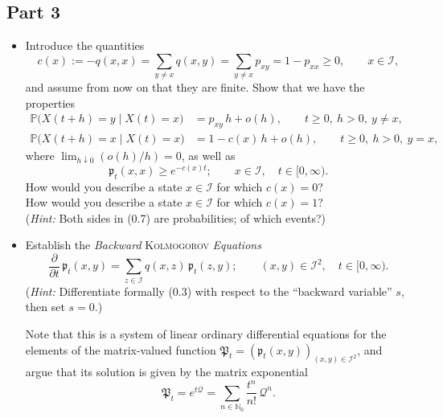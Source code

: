 \documentclass[letterpaper]{article}
\begin{document}
			\subsection{Part 3}
			\begin{itemize}
			\item[(d)] Introduce the quantities
			\begin{equation}
				c(x) := -q(x,x) = \sum_{y \neq x} q(x,y) = \sum_{y \neq x} p_{xy} = 1 - p_{xx} \geq 0, \qquad x \in \mathcal{I}, \tag{0.6}
			\end{equation}
			and assume from now on that they are finite. Show that we have the properties
			\begin{align*}
				\mathbb{P}\bigl(X(t+h) = y \mid X(t) = x\bigr) &= p_{xy}\, h + o(h), \qquad t \geq 0,\ h > 0,\ y \neq x, \\
				\mathbb{P}\bigl(X(t+h) = x \mid X(t) = x\bigr) &= 1 - c(x)\, h + o(h), \qquad t \geq 0,\ h > 0,\ y = x,
			\end{align*}
			where $\lim_{h \downarrow 0}(o(h)/h) = 0$, as well as
			\begin{equation}
				\mathfrak{p}_t(x,x) \geq e^{-c(x)t}; \qquad x \in \mathcal{I}, \quad t \in [0,\infty). \tag{0.7}
			\end{equation}
			How would you describe a state $x \in \mathcal{I}$ for which $c(x) = 0$?\\
			How would you describe a state $x \in \mathcal{I}$ for which $c(x) = 1$?\\
			(\textit{Hint:} Both sides in (0.7) are probabilities; of which events?)
			
			\item[(e)] Establish the \textit{Backward} \textsc{Kolmogorov} \textit{Equations}
			\begin{equation}
				\frac{\partial}{\partial t}\, \mathfrak{p}_t(x,y) = \sum_{z \in \mathcal{I}} q(x,z)\, \mathfrak{p}_t(z,y); \qquad (x,y) \in \mathcal{I}^2, \quad t \in [0,\infty). \tag{0.8}
			\end{equation}
			(\textit{Hint:} Differentiate formally (0.3) with respect to the ``backward variable'' $s$, then set $s = 0$.)
			
			Note that this is a system of linear ordinary differential equations for the elements of the matrix-valued function $\mathfrak{P}_t = (\mathfrak{p}_t(x,y))_{(x,y) \in \mathcal{I}^2}$, and argue that its solution is given by the matrix exponential
			\[
			\mathfrak{P}_t = e^{t\mathcal{Q}} = \sum_{n \in \mathbb{N}_0} \frac{t^n}{n!}\, \mathcal{Q}^n.
			\]
				\end{itemize}
		
\end{document}
